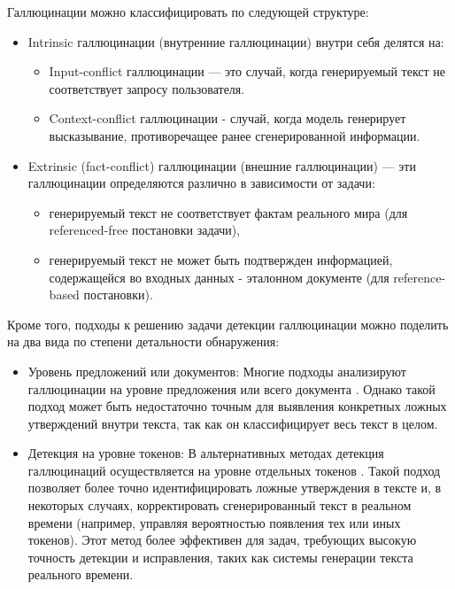 \documentclass[12pt]{article}
\begin{document}
Галлюцинации можно классифицировать по следующей структуре:
    \begin{itemize}
        \item Intrinsic галлюцинации (внутренние галлюцинации) внутри себя делятся на:
        \begin{itemize}
            \item Input-conflict галлюцинации
        — это случай, когда генерируемый текст не соответствует запросу пользователя. 
            \item Context-conflict галлюцинации - случай, когда модель генерирует высказывание, противоречащее ранее сгенерированной информации.
        \end{itemize}
        
        \item Extrinsic (fact-conflict) галлюцинации (внешние галлюцинации) — эти галлюцинации определяются различно в зависимости от задачи:
            \begin{itemize}
                \item генерируемый текст не соответствует фактам реального мира (для referenced-free постановки задачи),
                \item генерируемый текст не может быть подтвержден информацией, содержащейся во входных данных - эталонном документе (для reference-based постановки).
            \end{itemize}
    \end{itemize}

Кроме того, подходы к решению задачи детекции галлюцинации можно поделить на два вида по степени детальности обнаружения:
\begin{itemize}
   \item Уровень предложений или документов: Многие подходы анализируют галлюцинации на уровне предложения или всего документа \cite{zhao2024calibration}. Однако такой подход может быть недостаточно точным для выявления конкретных ложных утверждений внутри текста, так как он классифицирует весь текст в целом.
   \item Детекция на уровне токенов: В альтернативных методах детекция галлюцинаций осуществляется на уровне отдельных токенов \cite{liu2021hades, wang2024reliable}. Такой подход позволяет более точно идентифицировать ложные утверждения в тексте и, в некоторых случаях, корректировать сгенерированный текст в реальном времени (например, управляя вероятностью появления тех или иных токенов). Этот метод более эффективен для задач, требующих высокую точность детекции и исправления, таких как системы генерации текста реального времени.
\end{itemize}
\end{document}
